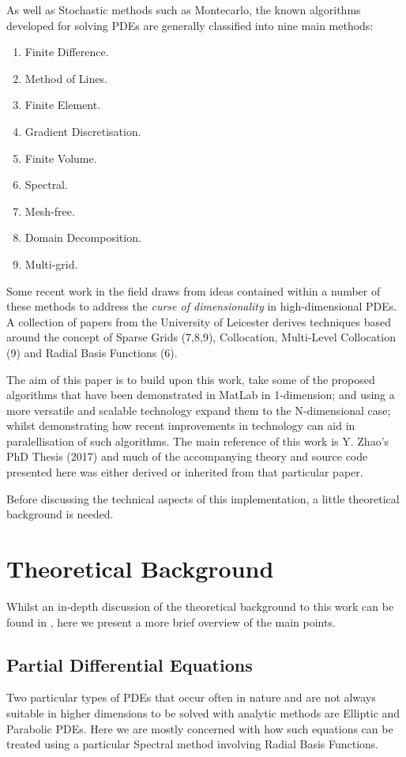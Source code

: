 \documentclass[a4paper]{amsart}
\begin{document}
As well as Stochastic methods such as Montecarlo, the known algorithms developed for solving PDEs are generally classified into nine main methods:\\
\renewcommand{\labelenumi}{\arabic{enumi}}
\begin{enumerate}
\item  Finite Difference.
\item  Method of Lines.
\item  Finite Element.
\item  Gradient Discretisation.
\item  Finite Volume.
\item  Spectral.
\item  Mesh-free.
\item  Domain Decomposition.
\item  Multi-grid.
\end{enumerate}

Some recent work in the field draws from ideas contained within a number of these methods to address the \emph{curse of dimensionality} in high-dimensional PDEs. A collection of papers from the University of Leicester\cite{mski0} \cite{mski1} \cite{mski2} derives techniques based around the concept of Sparse Grids (7,8,9), Collocation, Multi-Level Collocation (9) and Radial Basis Functions (6).

The aim of this paper is to build upon this work, take some of the proposed algorithms that have been demonstrated in MatLab in 1-dimension; and using a more versatile and scalable technology expand them to the N-dimensional case; whilst demonstrating how recent improvements in technology can aid in paralellisation of such algorithms. The main reference of this work is Y. Zhao's PhD Thesis (2017) \cite{mski0} and much of the accompanying theory and source code presented here was either derived or inherited from that particular paper.

Before discussing the technical aspects of this implementation, a little theoretical background is needed.

\newpage

\section{Theoretical Background}
Whilst an in-depth discussion of the theoretical background to this work can be found in \cite{mski0}, here we present a more brief overview of the main points.

\subsection{Partial Differential Equations}
Two particular types of PDEs that occur often in nature and are not always suitable in higher dimensions to be solved with analytic methods are Elliptic and Parabolic PDEs. Here we are mostly concerned with how such equations can be treated using a particular Spectral method involving Radial Basis Functions.
\end{document}
